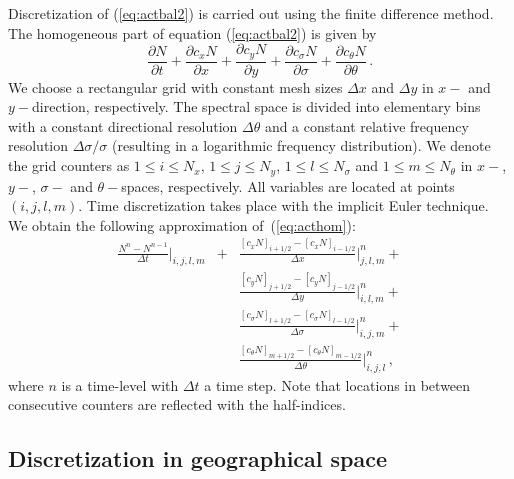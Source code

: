 \documentclass[12pt]{book}
\begin{document}
Discretization of (\ref{eq:actbal2}) is carried out using the finite difference method.
The homogeneous part of equation (\ref{eq:actbal2}) is given by
\begin{equation}
  \frac{\partial N}{\partial t} +
  \frac{\partial c_x N}{\partial x} +
  \frac{\partial c_y N}{\partial y} +
  \frac{\partial c_\sigma N}{\partial \sigma} +
  \frac{\partial c_\theta N}{\partial \theta}\, .
  \label{eq:acthom}
\end{equation}
We choose a rectangular grid with constant mesh sizes $\Delta x$ and $\Delta y$ in $x-$ and $y-$direction,
respectively. The spectral space is divided into elementary bins with a constant directional
resolution $\Delta \theta$ and a constant relative frequency resolution $\Delta \sigma/\sigma$
(resulting in a logarithmic frequency distribution). We denote the grid counters as $1 \leq i \leq N_x$,
$1 \leq j \leq N_y$, $1 \leq l \leq N_{\sigma}$ and $1 \leq m \leq N_{\theta}$ in $x-$, $y-$, $\sigma-$
and $\theta-$spaces, respectively. All variables are located at points $(i,j,l,m)$. Time discretization
takes place with the implicit Euler technique. We obtain the following approximation of~(\ref{eq:acthom}):
\begin{eqnarray}
    \frac{N^{n}-N^{n-1}}{\Delta t}|_{i,j,l,m} &+&
    \frac{[c_x N]_{i+1/2}-[c_x N]_{i-1/2}}{\Delta x}|^{n}_{j,l,m} + \nonumber \\
  &&\frac{[c_y N]_{j+1/2}-[c_y N]_{j-1/2}}{\Delta y}|^{n}_{i,l,m} + \nonumber \\
  &&\frac{[c_\sigma N]_{l+1/2}-[c_\sigma N]_{l-1/2}}{\Delta \sigma}|^{n}_{i,j,m} + \nonumber \\
  &&\frac{[c_\theta N]_{m+1/2}-[c_\theta N]_{m-1/2}}{\Delta \theta}|^{n}_{i,j,l}\, ,
  \label{eq:actdisc}
\end{eqnarray}
where $n$ is a time-level with $\Delta t$ a time step. Note that locations in between consecutive
counters are reflected with the half-indices.

\subsection{Discretization in geographical space}
\end{document}
